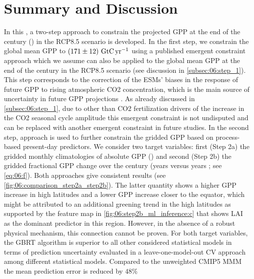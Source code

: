 \section{Summary and Discussion}
\label{sec:06:summary_and_discussion}

In this , a two-step approach to constrain the
projected \ac{GPP} at the end of the  century () in
the \acs{RCP}8.5 scenario is developed. In the first step, we constrain the
global mean \ac{GPP} to $\pmrangeunit{171}{12}{\GtCyr{}}$ using a published
emergent constraint approach which we assume can also be applied to the global
mean \ac{GPP} at the end of the  century in the \acs{RCP}8.5 scenario
(see discussion in \cref{subsec:06:step_1}). This step corresponds to the
correction of the \acp{ESM}' biases in the response of future \ac{GPP} to
rising atmospheric \ac{CO2} concentration, which is the main source of
uncertainty in future \ac{GPP} projections \autocite{Arora2013, Haverd2020,
  Rogers2017}. As already discussed in \cref{subsec:06:step_1}, due to other
than \ac{CO2} fertilization drivers of the increase in the \ac{CO2} seasonal
cycle amplitude \autocite{Bastos2019, Forkel2016, Piao2018, Zhao2016} this
emergent constraint is not undisputed and can be replaced with another emergent
constraint in future studies. In the second step,  approach is used to
further constrain the gridded \ac{GPP} based on process-based present-day
predictors. We consider two target variables: first (Step 2a) the gridded
monthly climatologies of absolute \ac{GPP} () and second
(Step 2b) the gridded fractional \ac{GPP} change over the  century
(years  versus years ; see \cref{eq:06:f}).
Both approaches give consistent results (see
\cref{fig:06:comparison_step2a_step2b}). The latter quantity shows a higher
\ac{GPP} increase in high latitudes and a lower \ac{GPP} increase closer to the
equator, which might be attributed to an additional greening trend in the high
latitudes as supported by the feature map in
\cref{fig:06:step2b_ml_inference:c} that shows \ac{LAI} as the dominant
predictor in this region. However, in the absence of a robust physical
mechanism, this connection cannot be proven. For both target variables, the
\ac{GBRT} algorithm is superior to all other considered statistical models in
terms of prediction uncertainty evaluated in a leave-one-model-out \ac{CV}
approach among different statistical models. Compared to the unweighted
\acs{CMIP}5 \ac{MMM} the mean prediction error is reduced by $48 \unit{\%}$
